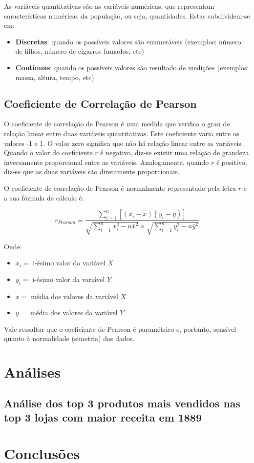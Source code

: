 \documentclass[
]{estat/estat}
\providecommand{\tightlist}{%
  \setlength{\itemsep}{0pt}\setlength{\parskip}{0pt}}\usepackage{longtable,booktabs,array}
\let\oldsection\section
\renewcommand\section{\clearpage\oldsection}
\begin{document}
As variáveis quantitativas são as variáveis numéricas, que representam
características numéricas da população, ou seja, quantidades. Estas
subdividem-se em:

\begin{itemize}
\tightlist
\item
  \textbf{Discretas}: quando os possíveis valores são enumeráveis
  (exemplos: número de filhos, número de cigarros fumados, etc)
\item
  \textbf{Contínuas}: quando os possíveis valores são resultado de
  medições (exemplos: massa, altura, tempo, etc)
\end{itemize}

\subsection{Coeficiente de Correlação de
Pearson}\label{coeficiente-de-correlauxe7uxe3o-de-pearson}

O coeficiente de correlação de Pearson é uma medida que verifica o grau
de relação linear entre duas variáveis quantitativas. Este coeficiente
varia entre os valores -1 e 1. O valor zero significa que não há relação
linear entre as variáveis. Quando o valor do coeficiente \(r\) é
negativo, diz-se existir uma relação de grandeza inversamente
proporcional entre as variáveis. Analogamente, quando \(r\) é positivo,
diz-se que as duas variáveis são diretamente proporcionais.

O coeficiente de correlação de Pearson é normalmente representado pela
letra \(r\) e a sua fórmula de cálculo é:

\[
r_{Pearson} = \frac{\displaystyle \sum_{i=1}^{n} \left [ \left(x_i-\bar{x}\right) \left(y_i-\bar{y}\right) \right]}{\sqrt{\displaystyle \sum_{i=1}^{n} x_i^2 - n\bar{x}^2}  \times \sqrt{\displaystyle \sum_{i=1}^{n} y_i^2 - n\bar{y}^2}}
\]

Onde:

\begin{itemize}
\tightlist
\item
  \(x_i =\) i-ésimo valor da variável \(X\)
\item
  \(y_i =\) i-ésimo valor da variável \(Y\)
\item
  \(\bar{x} =\) média dos valores da variável \(X\)
\item
  \(\bar{y} =\) média dos valores da variável \(Y\)
\end{itemize}

Vale ressaltar que o coeficiente de Pearson é paramétrico e, portanto,
sensível quanto à normalidade (simetria) dos dados.

\section{Análises}\label{anuxe1lises}

\subsection{Análise dos top 3 produtos mais vendidos nas top 3 lojas com
maior receita em
1889}\label{anuxe1lise-dos-top-3-produtos-mais-vendidos-nas-top-3-lojas-com-maior-receita-em-1889}

\section{Conclusões}\label{conclusuxf5es}
\end{document}
